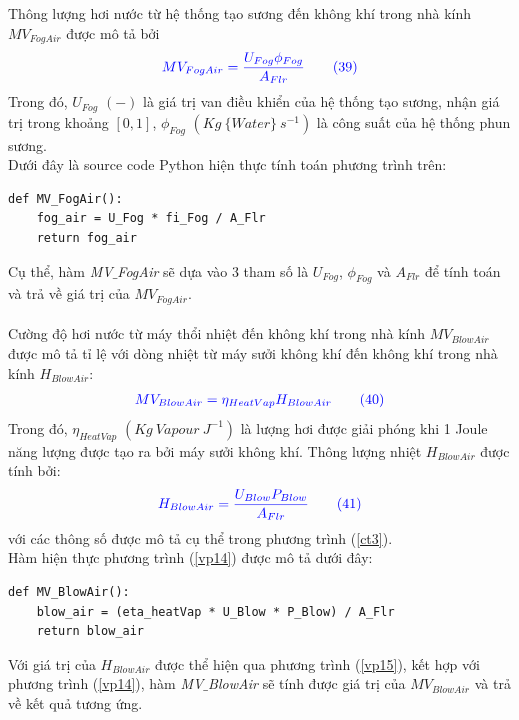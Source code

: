 \documentclass[13pt,a4paper]{article}
\begin{document}
			Thông lượng hơi nước từ hệ thống tạo sương đến không khí trong nhà kính $MV_{FogAir}$ được mô tả bởi 
			\begin{align}
				\color{blue}
					MV_{FogAir} = \dfrac{U_{Fog}\phi_{Fog}}{A_{Flr}}
				\color{blue}
				\tag{39}\label{vp13}
			\end{align}
			Trong đó, $U_{Fog}$ $(-)$ là giá trị van điều khiển của hệ thống tạo sương, nhận giá trị trong khoảng $[0,1]$, $\phi_{Fog}$ $(Kg\ \{Water\}\ s^{-1})$ là công suất của hệ thống phun sương.\\
			Dưới đây là source code Python hiện thực tính toán phương trình trên:
\begin{lstlisting}
def MV_FogAir():
	fog_air = U_Fog * fi_Fog / A_Flr
	return fog_air
\end{lstlisting}
			Cụ thể, hàm \textit{MV$\_$FogAir} sẽ dựa vào 3 tham số là $U_{Fog}$, $\phi_{Fog}$ và $A_{Flr}$ để tính toán và trả về giá trị của $MV_{FogAir}$. \\ \\
			
			Cường độ hơi nước từ máy thổi nhiệt đến không khí trong nhà kính $MV_{BlowAir}$ được mô tả tỉ lệ với dòng nhiệt từ máy sưởi không khí đến không khí trong nhà kính $H_{BlowAir}$:
			\begin{align}
				\color{blue}
					MV_{BlowAir} = \eta_{HeatVap}H_{BlowAir}
				\color{blue}
				\tag{40}\label{vp14}
			\end{align}
			Trong đó, $\eta_{HeatVap}$ $(Kg\ {Vapour}\ J^{-1})$ là lượng hơi được giải phóng khi 1 Joule năng lượng được tạo ra bởi máy sưởi không khí. Thông lượng nhiệt $H_{BlowAir}$ được tính bởi:
			\begin{align}
				\color{blue}
					H_{BlowAir} = \dfrac{U_{Blow}P_{Blow}}{A_{Flr}}
				\color{blue}
				\tag{41}\label{vp15}
			\end{align}
			với các thông số được mô tả cụ thể trong phương trình (\ref{ct3}). \\
			Hàm hiện thực phương trình (\ref{vp14}) được mô tả dưới đây:
\begin{lstlisting}
def MV_BlowAir():
	blow_air = (eta_heatVap * U_Blow * P_Blow) / A_Flr
	return blow_air
\end{lstlisting}
			Với giá trị của $H_{BlowAir}$ được thể hiện qua phương trình (\ref{vp15}), kết hợp với phương trình (\ref{vp14}), hàm \textit{MV$\_$BlowAir} sẽ tính được giá trị của $MV_{BlowAir}$ và trả về kết quả tương ứng. \\ \\
\end{document}
